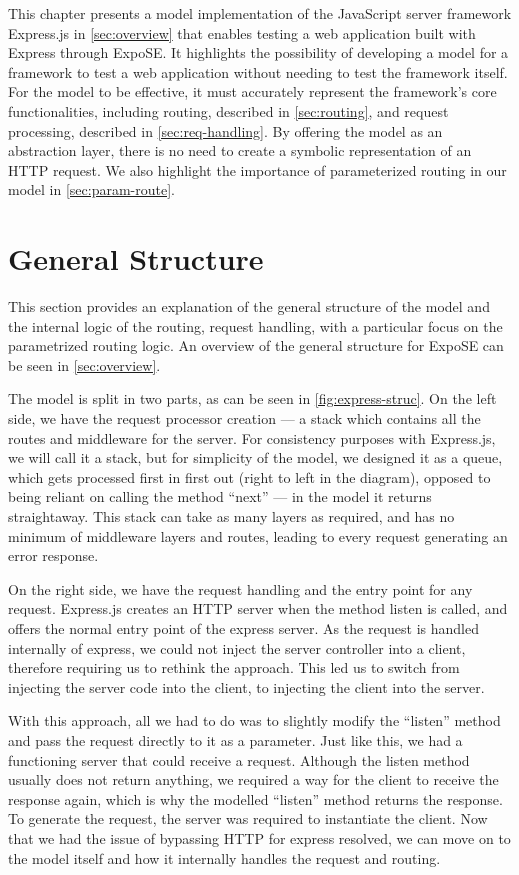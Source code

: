 This chapter presents a model implementation of the JavaScript server framework Express.js in \autoref{sec:overview} that enables testing a web application built with Express through ExpoSE. It highlights the possibility of developing a model for a framework to test a web application without needing to test the framework itself. For the model to be effective, it must accurately represent the framework's core functionalities, including routing, described in \autoref{sec:routing}, and request processing, described in \autoref{sec:req-handling}. By offering the model as an abstraction layer, there is no need to create a symbolic representation of an HTTP request. We also highlight the importance of parameterized routing in our model in \autoref{sec:param-route}.
\section{General Structure}

This section provides an explanation of the general structure of the model and the internal logic of the routing, request handling, with a particular focus on the parametrized routing logic. An overview of the general structure for ExpoSE can be seen in \autoref{sec:overview}.

The model is split in two parts, as can be seen in \autoref{fig:express-struc}. On the left side, we have the request processor creation — a stack which contains all the routes and middleware for the server. For consistency purposes with Express.js, we will call it a stack, but for simplicity of the model, we designed it as a queue, which gets processed first in first out (right to left in the diagram), opposed to being reliant on calling the method “next” — in the model it returns straightaway. 
This stack can take as many layers as required, and has no minimum of middleware layers and routes, leading to every request generating an error response. 



On the right side, we have the request handling and the entry point for any request. 
Express.js creates an HTTP server when the method listen is called, and offers the normal entry point of the express server. As the request is handled internally of express, we could not inject the server controller into a client, therefore requiring us to rethink the approach. This led us to switch from injecting the server code into the client, to injecting the client into the server. 

With this approach, all we had to do was to slightly modify the “listen” method and pass the request directly to it as a parameter. Just like this, we had a functioning server that could receive a request. Although the listen method usually does not return anything, we required a way for the client to receive the response again, which is why the modelled “listen” method returns the response.
To generate the request, the server was required to instantiate the client. Now that we had the issue of bypassing HTTP for express resolved, we can move on to the model itself and how it internally handles the request and routing.

